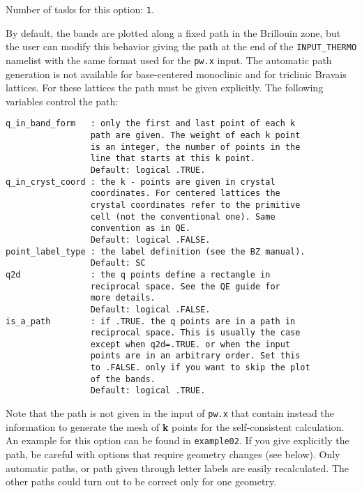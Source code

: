 \documentclass[12pt,a4paper,twoside]{report}
\begin{document}
Number of tasks for this option: \texttt{1}.

By default, the bands are plotted along a fixed path in the Brillouin
zone, but the user can modify this behavior giving the path at the end of 
the \texttt{INPUT\_THERMO} namelist with the same format used for 
the \texttt{pw.x} input. The automatic path generation is not available 
for base-centered monoclinic and for triclinic Bravais lattices. For these
lattices the path must be given explicitly.
The following variables control the path:

\begin{verbatim}
q_in_band_form   : only the first and last point of each k 
                 path are given. The weight of each k point 
                 is an integer, the number of points in the 
                 line that starts at this k point.
                 Default: logical .TRUE.
q_in_cryst_coord : the k - points are given in crystal 
                 coordinates. For centered lattices the 
                 crystal coordinates refer to the primitive 
                 cell (not the conventional one). Same 
                 convention as in QE.
                 Default: logical .FALSE.
point_label_type : the label definition (see the BZ manual).
                 Default: SC
q2d              : the q points define a rectangle in 
                 reciprocal space. See the QE guide for 
                 more details.
                 Default: logical .FALSE.
is_a_path        : if .TRUE. the q points are in a path in 
                 reciprocal space. This is usually the case 
                 except when q2d=.TRUE. or when the input 
                 points are in an arbitrary order. Set this 
                 to .FALSE. only if you want to skip the plot 
                 of the bands.
                 Default: logical .TRUE.
\end{verbatim}

Note that the path is not given in the input of \texttt{pw.x} that
contain instead the information to generate the mesh of {\bf k} points 
for the self-consistent calculation. 
An example for this option can be found in \texttt{example02}.
If you give explicitly the path, be careful with options that require
geometry changes (see below). Only automatic paths, or path given through 
letter labels are easily recalculated. The other paths could turn out 
to be correct only for one geometry.
\end{document}

